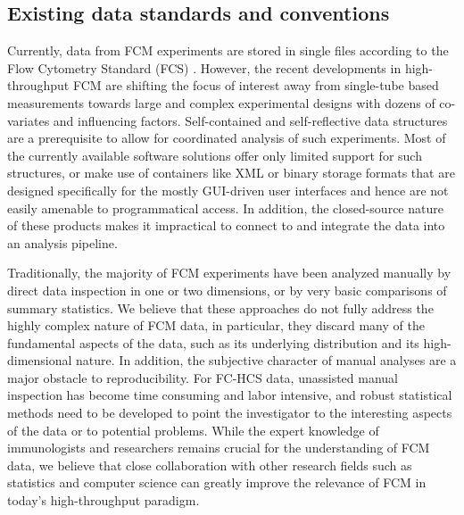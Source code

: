 \documentclass[12pt]{article}
\begin{document}
\subsection*{Existing data standards and conventions}
Currently, data from FCM experiments are stored in single files
according to the Flow Cytometry Standard (FCS) \citep{seamer1997pnd}.
However, the recent
developments in high-throughput FCM are shifting the focus
of interest away from single-tube based measurements towards large and
complex experimental designs with dozens of co-variates and
influencing factors. Self-contained and self-reflective data
structures are a prerequisite to allow for coordinated analysis of
such experiments. Most of the currently available software solutions
offer only limited support for such structures, or make use of
containers like XML or binary storage formats that are designed
specifically for the mostly GUI-driven user interfaces and hence are
not easily amenable to programmatical access. In addition, the
closed-source nature of %
these products makes it impractical to
connect to and integrate the data into an analysis pipeline.

Traditionally, the majority of FCM experiments have been analyzed
manually by direct data inspection in one or two dimensions, or by
very basic comparisons of summary statistics. We believe that these
approaches do not fully address the highly complex nature of FCM data,
in particular, they discard many of the fundamental aspects of the
data, such as its underlying distribution and its high-dimensional
nature. In addition, the subjective character of manual analyses are a
major obstacle to reproducibility. For FC-HCS data, unassisted manual
inspection has become time consuming and labor intensive, and robust
statistical methods need to be developed to point the investigator to
the interesting aspects of the data or to potential problems. While
the expert knowledge of immunologists and researchers remains crucial
for the understanding of FCM data, we believe that close collaboration
with other research fields such as statistics and computer science can
greatly improve the relevance of FCM in today's high-throughput
paradigm.
\end{document}
